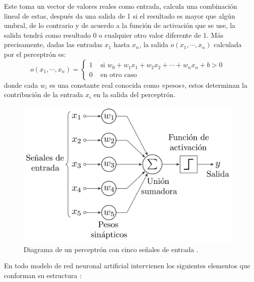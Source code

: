 \documentclass[12pt,letterpaper,oneside,openright]{book}
\begin{document}
	Este toma un vector de valores reales como entrada, calcula una combinación lineal de estas, después da una salida de 1 si el resultado es mayor que algún umbral, de lo contrario y de acuerdo a la función de activación que se use, la salida tendrá como resultado 0 o cualquier otro valor diferente de 1. Más precisamente, dadas las entradas $x_1$ hasta $x_n$, la salida $o(x_1,\dotsb,x_n)$ calculada por el perceptrón es: 
	\begin{equation}
		\label{eq:percept}
		o(x_1,\dotsb,x_n) = \left\{\begin{array}{lll}
			1 & \text { si } w_0 + w_1x_1 + w_2x_2 + \dotsb + w_nx_n + b > 0 \\
			0 & \text { en otro caso } 
		\end{array}\right.
	\end{equation}
	donde cada $w_i$ es una constante real conocida como «pesos», estos determinan la contribución de la entrada $x_i$ en la salida del perceptrón.
	\begin{figure}[h]
		\centering
		\includegraphics[width=0.8\linewidth]{Sem_1/figuras/Perceptron}
		\caption{Diagrama de un perceptrón con cinco señales de entrada \cite{imaPercep}.}
		\label{fig:diagrama_perceptron}
	\end{figure}
	En todo modelo de red neuronal artificial intervienen los siguientes elementos que conforman su estructura \cite{monsSistem}: 
\end{document}
